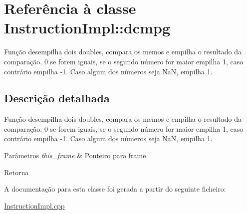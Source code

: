 \hypertarget{class_instruction_impl_1_1dcmpg}{}\section{Referência à classe Instruction\+Impl\+:\+:dcmpg}
\label{class_instruction_impl_1_1dcmpg}


Função desempilha dois doubles, compara os memos e empilha o resultado da comparação. 0 se forem iguais, se o segundo número for maior empilha 1, caso contrário empilha -\/1. Caso algum dos números seja NaN, empilha 1.  




\subsection{Descrição detalhada}
Função desempilha dois doubles, compara os memos e empilha o resultado da comparação. 0 se forem iguais, se o segundo número for maior empilha 1, caso contrário empilha -\/1. Caso algum dos números seja NaN, empilha 1. 


\begin{DoxyParams}{Parâmetros}
{\em this\+\_\+frame} & Ponteiro para frame. \\
\hline
\end{DoxyParams}
\begin{DoxyReturn}{Retorna}

\end{DoxyReturn}


A documentação para esta classe foi gerada a partir do seguinte ficheiro\+:\begin{DoxyCompactItemize}
\item 
\hyperlink{_instruction_impl_8cpp}{Instruction\+Impl.\+cpp}\end{DoxyCompactItemize}
